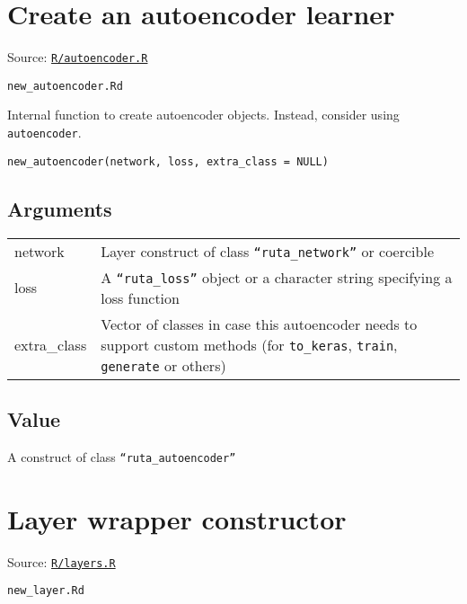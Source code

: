 \section{Create an autoencoder
learner}\label{create-an-autoencoder-learner-1}

Source:
\href{https://github.com/fdavidcl/ruta/blob/master/R/autoencoder.R}{\texttt{R/autoencoder.R}}

\texttt{new\_autoencoder.Rd}

Internal function to create autoencoder objects. Instead, consider using
\texttt{autoencoder}.

\begin{verbatim}
new_autoencoder(network, loss, extra_class = NULL)
\end{verbatim}

\hypertarget{arguments}{\subsection{\texorpdfstring{\protect\hyperlink{arguments}{}Arguments}{Arguments}}\label{arguments}}

\begin{longtable}[c]{@{}>{\small}p{3cm}>{\raggedright}p{12.5cm}@{}}
\toprule
network & Layer construct of class \texttt{``ruta\_network''} or
coercible\tabularnewline
loss & A \texttt{``ruta\_loss''} object or a character string specifying a
loss function\tabularnewline
extra\_class & Vector of classes in case this autoencoder needs to
support custom methods (for \texttt{to\_keras}, \texttt{train},
\texttt{generate} or others)\tabularnewline
\bottomrule
\end{longtable}

\hypertarget{value}{\subsection{\texorpdfstring{\protect\hyperlink{value}{}Value}{Value}}\label{value}}

A construct of class \texttt{``ruta\_autoencoder''}

\section{Layer wrapper constructor}\label{layer-wrapper-constructor}

Source:
\href{https://github.com/fdavidcl/ruta/blob/master/R/layers.R}{\texttt{R/layers.R}}

\texttt{new\_layer.Rd}

